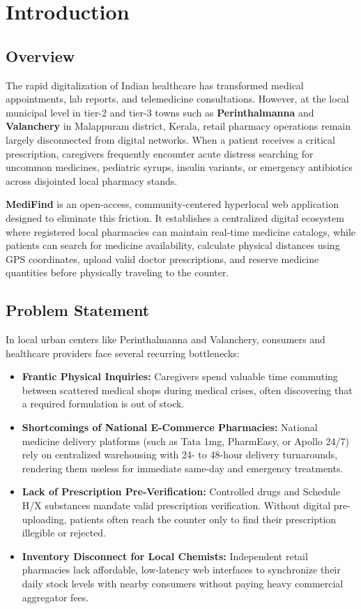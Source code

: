 \documentclass[12pt,a4paper]{report}
\begin{document}
\chapter{Introduction}

\section{Overview}
The rapid digitalization of Indian healthcare has transformed medical appointments, lab reports, and telemedicine consultations. However, at the local municipal level in tier-2 and tier-3 towns such as \textbf{Perinthalmanna} and \textbf{Valanchery} in Malappuram district, Kerala, retail pharmacy operations remain largely disconnected from digital networks. When a patient receives a critical prescription, caregivers frequently encounter acute distress searching for uncommon medicines, pediatric syrups, insulin variants, or emergency antibiotics across disjointed local pharmacy stands.

\textbf{MediFind} is an open-access, community-centered hyperlocal web application designed to eliminate this friction. It establishes a centralized digital ecosystem where registered local pharmacies can maintain real-time medicine catalogs, while patients can search for medicine availability, calculate physical distances using GPS coordinates, upload valid doctor prescriptions, and reserve medicine quantities before physically traveling to the counter.

\section{Problem Statement}
In local urban centers like Perinthalmanna and Valanchery, consumers and healthcare providers face several recurring bottlenecks:
\begin{itemize}
    \item \textbf{Frantic Physical Inquiries:} Caregivers spend valuable time commuting between scattered medical shops during medical crises, often discovering that a required formulation is out of stock.
    \item \textbf{Shortcomings of National E-Commerce Pharmacies:} National medicine delivery platforms (such as Tata 1mg, PharmEasy, or Apollo 24/7) rely on centralized warehousing with 24- to 48-hour delivery turnarounds, rendering them useless for immediate same-day and emergency treatments.
    \item \textbf{Lack of Prescription Pre-Verification:} Controlled drugs and Schedule H/X substances mandate valid prescription verification. Without digital pre-uploading, patients often reach the counter only to find their prescription illegible or rejected.
    \item \textbf{Inventory Disconnect for Local Chemists:} Independent retail pharmacies lack affordable, low-latency web interfaces to synchronize their daily stock levels with nearby consumers without paying heavy commercial aggregator fees.
\end{itemize}
\end{document}
